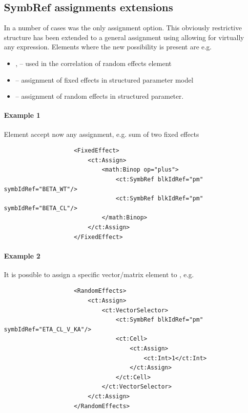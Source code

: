 \subsection{SymbRef assignments extensions}
\label{subsec:symbRefAssign}
In a number of cases  was the only assignment option.
This obviously restrictive structure has been extended to a general assignment
using  allowing for virtually any expression. Elements where
the new possibility is present are e.g.  
\begin{itemize}
\item 
{},  -- used in the correlation
of random effects element
\item
{} -- assignment of fixed effects in structured parameter 
model
\item
{}  -- assignment of random effects in structured parameter.
\end{itemize}

\paragraph{Example 1}
Element  accept now any assignment, e.g. sum
of two fixed effects
\lstset{language=XML}
\begin{lstlisting}
                    <FixedEffect>
                        <ct:Assign>
                            <math:Binop op="plus">
                                <ct:SymbRef blkIdRef="pm" symbIdRef="BETA_WT"/>
                                <ct:SymbRef blkIdRef="pm" symbIdRef="BETA_CL"/>
                            </math:Binop>
                        </ct:Assign>
                    </FixedEffect>
\end{lstlisting}

\paragraph{Example 2}
It is possible to assign a specific vector/matrix element to , e.g.
\lstset{language=XML}
\begin{lstlisting}
                    <RandomEffects>
                        <ct:Assign>
                            <ct:VectorSelector>
                                <ct:SymbRef blkIdRef="pm" symbIdRef="ETA_CL_V_KA"/>
                                <ct:Cell>
                                    <ct:Assign>
                                        <ct:Int>1</ct:Int>
                                    </ct:Assign>
                                </ct:Cell>
                            </ct:VectorSelector>
                        </ct:Assign>
                    </RandomEffects>
\end{lstlisting}

